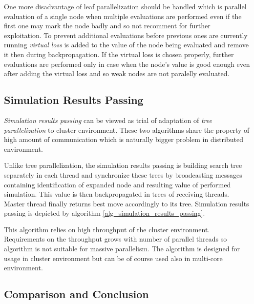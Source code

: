 One more disadvantage of leaf parallelization should be handled which is parallel evaluation of a
single node when multiple evaluations are performed even if the first one may mark the node badly
and so not recomment for further exploitation. To prevent additional evaluations before previous
ones are currently running \emph{virtual loss} is added to the value of the node being evaluated
and remove it then during backpropagation.
If the virtual loss is chosen properly, further evaluations are performed only in case when the
node's value is good enough even after adding the virtual loss and so weak nodes are not paralelly
evaluated.

\subsection{Simulation Results Passing}


\emph{Simulation results passing} can be viewed as trial of adaptation of \emph{tree
parallelization} to cluster environment. These two algorithms share the property of high amount of
communication which is naturally bigger problem in distributed environment.

Unlike tree parallelization, the simulation results passing is building search tree separately in
each thread and synchronize these trees by broadcasting messages containing identification of
expanded node and resulting value of performed simulation. This value is then backpropagated in
trees of receiving threads. Master thread finally returns best move accordingly to its tree.
Simulation results passing is depicted by algorithm \ref{alg_simulation_results_passing}.

This algorithm relies on high throughput of the cluster environment. Requirements on the throughput
grows with number of parallel threads so algorithm is not suitable for massive parallelism. The
algorithm is designed for usage in cluster environment but can be of course used also in multi-core
environment.


\subsection{Comparison and Conclusion}

